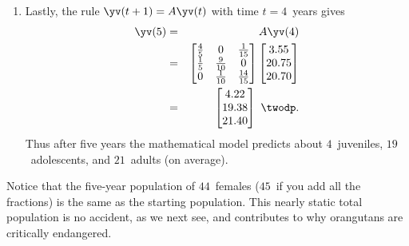 \begin{example}[orangutans]
\begin{solution}
\begin{enumerate}
\item Lastly, the rule \(\yv(t+1)=A\yv(t)\) with time \(t=4\)~years gives
\begin{eqnarray*}
\yv(5)&=&A\yv(4)
\\&=&\begin{bmatrix} \frac45&0&\frac1{15}
\\\frac15&\frac9{10}&0
\\0&\frac1{10}&\frac{14}{15} \end{bmatrix}
\begin{bmatrix} 3.55\\20.75\\20.70 \end{bmatrix}
\\&=&\begin{bmatrix} 4.22\\19.38\\21.40 \end{bmatrix}\ \twodp.
\end{eqnarray*}
Thus after five years the mathematical model predicts about \(4\)~juveniles, \(19\)~adolescents, and \(21\)~adults (on average).
%
\end{enumerate}
Notice that the five-year population of \(44\)~females (\(45\)~if you add all the fractions) is the same as the starting population.
This nearly static total population is no accident, as we next see, and contributes to why orangutans are critically endangered.
\end{solution}
\end{example}


